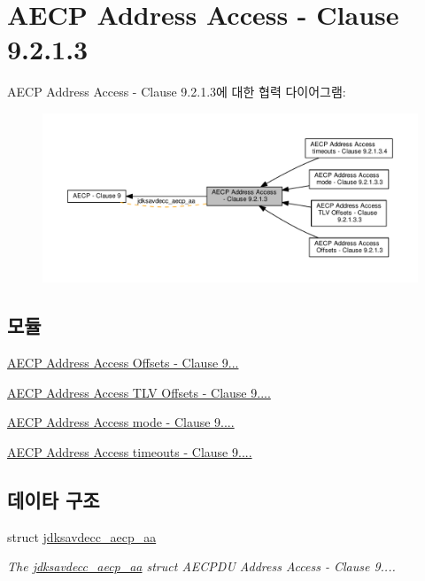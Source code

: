 \hypertarget{group___a_e_c_p___a_a}{}\section{A\+E\+CP Address Access -\/ Clause 9.2.1.3}
\label{group___a_e_c_p___a_a}
A\+E\+CP Address Access -\/ Clause 9.2.1.3에 대한 협력 다이어그램\+:
\nopagebreak
\begin{figure}[H]
\begin{center}
\leavevmode
\includegraphics[width=350pt]{group___a_e_c_p___a_a}
\end{center}
\end{figure}
\subsection*{모듈}
\begin{DoxyCompactItemize}
\item 
\hyperlink{group___a_e_c_p___a_a__offsets}{A\+E\+C\+P Address Access Offsets -\/ Clause 9...}
\item 
\hyperlink{group___a_e_c_p___a_a__tlv}{A\+E\+C\+P Address Access T\+L\+V Offsets -\/ Clause 9....}
\item 
\hyperlink{group___a_e_c_p___a_a__mode}{A\+E\+C\+P Address Access mode -\/ Clause 9....}
\item 
\hyperlink{group___a_e_c_p___a_a__timeouts}{A\+E\+C\+P Address Access timeouts -\/ Clause 9....}
\end{DoxyCompactItemize}
\subsection*{데이타 구조}
\begin{DoxyCompactItemize}
\item 
struct \hyperlink{structjdksavdecc__aecp__aa}{jdksavdecc\+\_\+aecp\+\_\+aa}
\begin{DoxyCompactList}\small\item\em The \hyperlink{structjdksavdecc__aecp__aa}{jdksavdecc\+\_\+aecp\+\_\+aa} struct A\+E\+C\+P\+DU Address Access -\/ Clause 9.... \end{DoxyCompactList}\end{DoxyCompactItemize}
